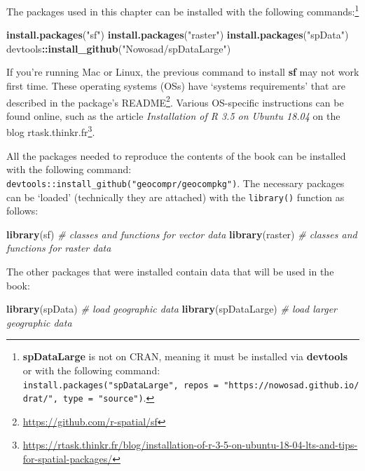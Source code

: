 \documentclass[]{krantz}
\newenvironment{Shaded}{\begin{snugshade}}{\end{snugshade}}
\newcommand{\CommentTok}[1]{\textcolor[rgb]{0.37,0.37,0.37}{\textit{#1}}}
\newcommand{\KeywordTok}[1]{\textcolor[rgb]{0.27,0.27,0.27}{\textbf{#1}}}
\newcommand{\NormalTok}[1]{#1}
\newcommand{\OperatorTok}[1]{\textcolor[rgb]{0.43,0.43,0.43}{\textbf{#1}}}
\newcommand{\StringTok}[1]{\textcolor[rgb]{0.5,0.5,0.5}{#1}}
\let\rmarkdownfootnote\footnote%
\def\footnote{\protect\rmarkdownfootnote}
\renewcommand{\href}[2]{#2\footnote{\url{#1}}}
\let\BeginKnitrBlock\begin \let\EndKnitrBlock\end
\begin{document}
The packages used in this chapter can be installed with the following commands:\footnote{\textbf{spDataLarge} is not on CRAN, meaning it must be installed via \textbf{devtools} or with the following command: \texttt{install.packages("spDataLarge",\ repos\ =\ "https://nowosad.github.io/drat/",\ type\ =\ "source")}.}

\begin{Shaded}
\begin{Highlighting}[]
\KeywordTok{install.packages}\NormalTok{(}\StringTok{"sf"}\NormalTok{)}
\KeywordTok{install.packages}\NormalTok{(}\StringTok{"raster"}\NormalTok{)}
\KeywordTok{install.packages}\NormalTok{(}\StringTok{"spData"}\NormalTok{)}
\NormalTok{devtools}\OperatorTok{::}\KeywordTok{install_github}\NormalTok{(}\StringTok{"Nowosad/spDataLarge"}\NormalTok{)}
\end{Highlighting}
\end{Shaded}

\BeginKnitrBlock{rmdnote}
If you're running Mac or Linux, the previous command to install \textbf{sf} may not work first time.
These operating systems (OSs) have `systems requirements' that are described in the package's \href{https://github.com/r-spatial/sf}{README}.
Various OS-specific instructions can be found online, such as the article \emph{Installation of R 3.5 on Ubuntu 18.04} on the blog \href{https://rtask.thinkr.fr/blog/installation-of-r-3-5-on-ubuntu-18-04-lts-and-tips-for-spatial-packages/}{rtask.thinkr.fr}.
\EndKnitrBlock{rmdnote}

All the packages needed to reproduce the contents of the book can be installed with the following command: \texttt{devtools::install\_github("geocompr/geocompkg")}.
The necessary packages can be `loaded' (technically they are attached) with the \texttt{library()} function as follows:

\begin{Shaded}
\begin{Highlighting}[]
\KeywordTok{library}\NormalTok{(sf)          }\CommentTok{# classes and functions for vector data}
\KeywordTok{library}\NormalTok{(raster)      }\CommentTok{# classes and functions for raster data}
\end{Highlighting}
\end{Shaded}

The other packages that were installed contain data that will be used in the book:

\begin{Shaded}
\begin{Highlighting}[]
\KeywordTok{library}\NormalTok{(spData)        }\CommentTok{# load geographic data}
\KeywordTok{library}\NormalTok{(spDataLarge)   }\CommentTok{# load larger geographic data}
\end{Highlighting}
\end{Shaded}
\end{document}
